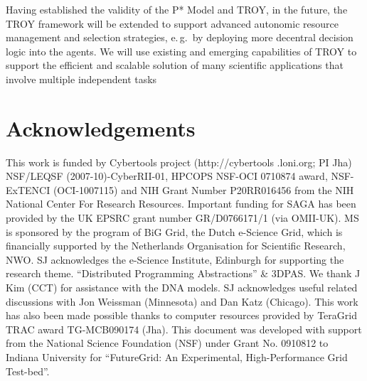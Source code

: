 \documentclass[conference,final]{IEEEtran}
\newcommand{\note}[1]{ {\textcolor{magenta} { ***Note: #1 }}}
\newcommand{\note}[1]{}
\newcommand{\up}{\vspace*{-1em}}
\newcommand{\upp}{\vspace*{-0.5em}}
\begin{document}

Having established the validity of the P* Model and TROY, in the
future, the TROY framework will be extended to support advanced
autonomic resource management and selection strategies, e.\,g.\ by
deploying more decentral decision logic into the agents. We will use
existing and emerging capabilities of TROY to support the efficient
and scalable solution of many scientific applications that involve
multiple independent tasks




\up
\section*{Acknowledgements\upp\upp}
\footnotesize{This work is funded by Cybertools project
  (http://cybertools .loni.org; PI Jha) NSF/LEQSF
  (2007-10)-CyberRII-01, HPCOPS NSF-OCI 0710874 award, NSF-ExTENCI
  (OCI-1007115) and NIH Grant Number P20RR016456 from the NIH National
  Center For Research Resources. Important funding for SAGA has been
  provided by the UK EPSRC grant number GR/D0766171/1 (via OMII-UK).
  MS is sponsored by the program of BiG Grid, the Dutch e-Science
  Grid, which is financially supported by the Netherlands Organisation
  for Scientific Research, NWO. SJ acknowledges the e-Science
  Institute, Edinburgh for supporting the research
  theme. ``Distributed Programming Abstractions'' \& 3DPAS. We thank J
  Kim (CCT) for assistance with the DNA models.  SJ acknowledges
  useful related discussions with Jon Weissman (Minnesota) and Dan
  Katz (Chicago). This work has also been made possible thanks to
  computer resources provided by TeraGrid TRAC award TG-MCB090174
  (Jha). This document was developed with support from the National
  Science Foundation (NSF) under Grant No.  0910812 to Indiana
  University for ``FutureGrid: An Experimental, High-Performance Grid
  Test-bed''.}

\up


\end{document}
